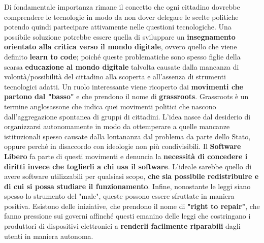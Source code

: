 Di fondamentale importanza rimane il concetto che ogni cittadino dovrebbe comprendere le tecnologie in modo da non dover delegare le scelte politiche potendo quindi partecipare attivamente nelle questioni tecnologiche.
\bigbreak
Una possibile soluzione potrebbe essere quella di sviluppare un \textbf{insegnamento orientato alla critica verso il mondo digitale}, ovvero quello che viene definito \textbf{learn to code}; poiché queste problematiche sono spesso figlie della scarsa \textbf{educazione al mondo digitale} talvolta causate dalla mancanza di volontà/possibilità del cittadino alla scoperta e all'assenza di strumenti tecnologici adatti.
\bigbreak
Un ruolo interessante viene ricoperto dai \textbf{movimenti che partono dal "basso"} e che prendono il nome di \textbf{grassroots}. Grassroots è un termine anglosassone che indica quei movimenti politici che nascono dall'aggregazione spontanea di gruppi di cittadini. L'idea nasce dal desiderio di organizzarsi autonomamente in modo da ottemperare a quelle mancanze istituzionali spesso causate dalla lontananza dal problema da parte dello Stato, oppure perché in disaccordo con ideologie non più condivisibili.
Il \textbf{Software Libero} fa parte di questi movimenti e denuncia la \textbf{necessità di concedere i diritti invece che toglierli a chi usa il software}. L'ideale sarebbe quello di avere software utilizzabili per qualsiasi scopo, \textbf{che sia possibile redistribuire e di cui si possa studiare il funzionamento}.
\bigbreak
Infine, nonostante le leggi siano spesso lo strumento del "male", queste possono essere sfruttate in maniera positiva. Esistono delle iniziative, che prendono il nome di \textbf{"right to repair"}, che fanno pressione sui governi affinché questi emanino delle leggi che costringano i produttori di dispositivi elettronici a \textbf{renderli facilmente riparabili} dagli utenti in maniera autonoma.


